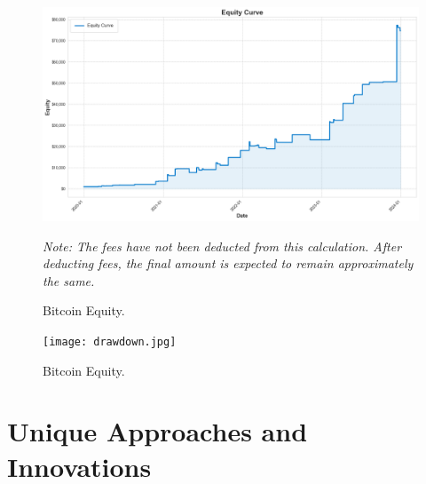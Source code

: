 \documentclass[12pt]{article}
\begin{document}
\newpage
\thispagestyle{empty}

\newpage
\thispagestyle{empty}

\begin{figure}[h] %
    \centering
    \includegraphics[width=\textwidth, height=2.2\textheight, keepaspectratio]{equity_mid.png} %
    \vspace{1em} %
    \caption{Bitcoin Equity.}
    \label{fig:sample-image} %
    \vspace{2\baselineskip} %
    \textit{Note: The fees have not been deducted from this calculation. After deducting fees, the final amount is expected to remain approximately the same.}
\end{figure}



\begin{figure}[htbp!] %
    \centering
    \texttt{[image: drawdown.jpg]} %
    \vspace{1em} %
    \caption{Bitcoin Equity.}
    \label{fig:sample-image} %

  
\end{figure}

\newpage
\thispagestyle{empty}
\mbox{}


\thispagestyle{empty}
\section{Unique Approaches and Innovations}
\end{document}
